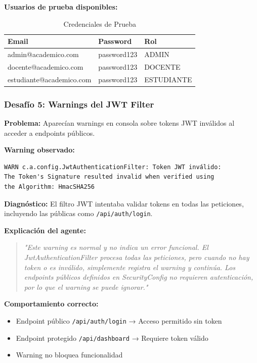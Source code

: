 \documentclass[11pt,a4paper]{article}
\begin{document}
\textbf{Usuarios de prueba disponibles:}
\begin{table}[H]
\centering
\begin{tabular}{|l|l|l|}
\hline
\rowcolor{gray!20}
\textbf{Email} & \textbf{Password} & \textbf{Rol} \\
\hline
admin@academico.com & password123 & ADMIN \\
\hline
docente@academico.com & password123 & DOCENTE \\
\hline
estudiante@academico.com & password123 & ESTUDIANTE \\
\hline
\end{tabular}
\caption{Credenciales de Prueba}
\end{table}

\subsubsection{Desafío 5: Warnings del JWT Filter}

\textbf{Problema:} Aparecían warnings en consola sobre tokens JWT inválidos al acceder a endpoints públicos.

\textbf{Warning observado:}
\begin{verbatim}
WARN c.a.config.JwtAuthenticationFilter: Token JWT inválido: 
The Token's Signature resulted invalid when verified using 
the Algorithm: HmacSHA256
\end{verbatim}

\textbf{Diagnóstico:} El filtro JWT intentaba validar tokens en todas las peticiones, incluyendo las públicas como \texttt{/api/auth/login}.

\textbf{Explicación del agente:}
\begin{quote}
\textit{"Este warning es normal y no indica un error funcional. El JwtAuthenticationFilter procesa todas las peticiones, pero cuando no hay token o es inválido, simplemente registra el warning y continúa. Los endpoints públicos definidos en SecurityConfig no requieren autenticación, por lo que el warning se puede ignorar."}
\end{quote}

\textbf{Comportamiento correcto:}
\begin{itemize}
    \item Endpoint público \texttt{/api/auth/login} → Acceso permitido sin token
    \item Endpoint protegido \texttt{/api/dashboard} → Requiere token válido
    \item Warning no bloquea funcionalidad
\end{itemize}
\end{document}
